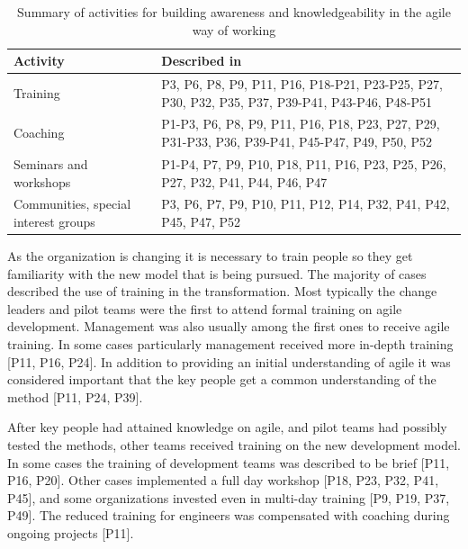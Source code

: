 \begin{table}[h]
    \centering
    \begin{tabular}{ >{\raggedright\arraybackslash}p{}
                     >{\raggedright\arraybackslash}p{} }
        \toprule
        Activity           &  Described in  \\
        \midrule
        Training    &
                P3, P6, P8, P9, P11, P16, P18-P21, P23-P25, P27, P30,
                P32, P35, P37, P39-P41, P43-P46, P48-P51  \\  %
        Coaching    &
                P1-P3, P6, P8, P9, P11, P16, P18, P23, P27, P29,
                P31-P33, P36, P39-P41, P45-P47, P49, P50, P52  \\  %
        Seminars and workshops   &
                P1-P4, P7, P9, P10, P18, P11, P16, P23, P25,
                P26, P27, P32, P41, P44, P46, P47   \\   %
        Communities, special interest groups  &
                P3, P6, P7, P9, P10, P11, P12, P14, P32, P41,
                P42, P45, P47, P52  \\   %
        \bottomrule
    \end{tabular}
    \caption{Summary of activities for building awareness and knowledgeability
             in the agile way of working}
    \label{table:transformation_training}
\end{table}



As the organization is changing it is necessary to train people so they get
familiarity with the new model that is being pursued. The majority of cases
described the use of training in the transformation.
Most typically the change leaders and pilot teams were the first to attend
formal training on agile development. Management was also usually among the
first ones to receive agile training. In some cases particularly management
received more in-depth training [P11, P16, P24]. In addition to providing an initial
understanding of agile it was considered important that the key people get a
common understanding of the method [P11, P24, P39].

After key people had attained knowledge on agile, and pilot teams had possibly
tested the methods, other teams received training on the new development model.
In some cases the training of development teams was described to be brief [P11,
P16, P20]. Other cases implemented a full day workshop [P18, P23, P32, P41,
P45], and some organizations invested even in multi-day training [P9, P19, P37,
P49].
The reduced training for engineers was compensated with coaching during ongoing
projects [P11].

